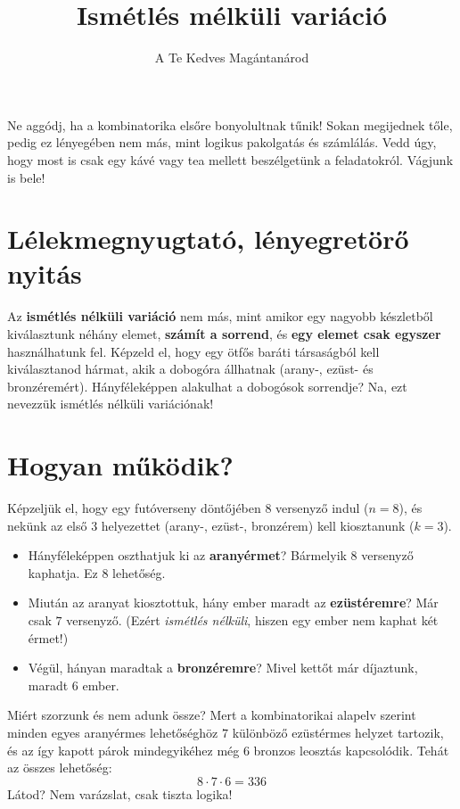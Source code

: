\documentclass[11pt,a4paper]{article}
\title{Ismétlés mélküli variáció}
\author{A Te Kedves Magántanárod}
\date{}
\begin{document}
\maketitle

\begin{tcolorbox}[colback=mysecondary,colframe=myprimary,arc=4pt,title=\textbf{Üdvözöllek, Kedves Diákum!}]
Ne aggódj, ha a kombinatorika elsőre bonyolultnak tűnik! Sokan megijednek tőle, pedig ez lényegében nem más, mint logikus pakolgatás és számlálás. Vedd úgy, hogy most is csak egy kávé vagy tea mellett beszélgetünk a feladatokról. Vágjunk is bele!
\end{tcolorbox}

\section{Lélekmegnyugtató, lényegretörő nyitás}
Az \textbf{ismétlés nélküli variáció} nem más, mint amikor egy nagyobb készletből kiválasztunk néhány elemet, \textbf{számít a sorrend}, és \textbf{egy elemet csak egyszer} használhatunk fel. Képzeld el, hogy egy ötfős baráti társaságból kell kiválasztanod hármat, akik a dobogóra állhatnak (arany-, ezüst- és bronzéremért). Hányféleképpen alakulhat a dobogósok sorrendje? Na, ezt nevezzük ismétlés nélküli variációnak!

\section{Hogyan működik?}
Képzeljük el, hogy egy futóverseny döntőjében 8 versenyző indul ($n = 8$), és nekünk az első 3 helyezettet (arany-, ezüst-, bronzérem) kell kiosztanunk ($k = 3$). 

\begin{itemize}
    \item Hányféleképpen oszthatjuk ki az \textbf{aranyérmet}? Bármelyik 8 versenyző kaphatja. Ez $8$ lehetőség.
    \item Miután az aranyat kiosztottuk, hány ember maradt az \textbf{ezüstéremre}? Már csak $7$ versenyző. (Ezért \emph{ismétlés nélküli}, hiszen egy ember nem kaphat két érmet!)
    \item Végül, hányan maradtak a \textbf{bronzéremre}? Mivel kettőt már díjaztunk, maradt $6$ ember.
\end{itemize}

Miért szorzunk és nem adunk össze? Mert a kombinatorikai alapelv szerint minden egyes aranyérmes lehetőséghöz $7$ különböző ezüstérmes helyzet tartozik, és az így kapott párok mindegyikéhez még $6$ bronzos leosztás kapcsolódik. Tehát az összes lehetőség:
\[ 8 \cdot 7 \cdot 6 = 336 \]
Látod? Nem varázslat, csak tiszta logika!
\end{document}
